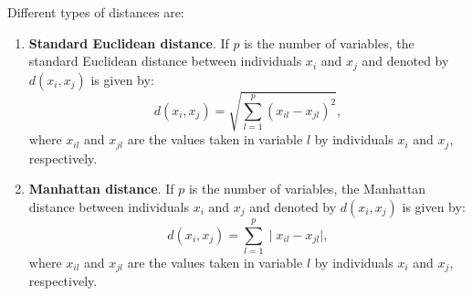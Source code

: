 Different types of distances are:
\begin{enumerate}
\item \textbf{Standard Euclidean distance}. If $p$ is the number of variables, the standard Euclidean distance between individuals $x_i$ and $x_j$ and denoted by $d(x_i,x_j)$ is given by:
\begin{equation*}
d(x_i,x_j)=\sqrt{\sum_{l=1}^p (x_{il} - x_{jl} )^2},
\end{equation*}
where $x_{il}$ and $x_{jl}$ are the values taken in variable $l$ by individuals $x_i$ and $x_j$, respectively.
\item \textbf{Manhattan distance}. If $p$ is the number of variables, the Manhattan distance between individuals $x_i$ and $x_j$ and denoted by  $d(x_i,x_j)$ is given by:
\begin{equation*}
d(x_i,x_j)=\sum_{l=1}^p \mid x_{il} - x_{jl} \mid,
\end{equation*}
where $x_{il}$ and $x_{jl}$ are the values taken in variable $l$ by individuals $x_i$ and $x_j$, respectively.


\end{enumerate}
